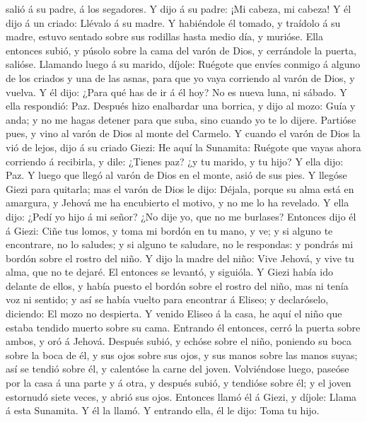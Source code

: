 salió á su padre, á los segadores.  Y dijo á su padre: ¡Mi
cabeza, mi cabeza! Y él dijo á un criado: Llévalo á su madre.
 Y habiéndole él tomado, y traídolo á su madre, estuvo
sentado sobre sus rodillas hasta medio día, y murióse. 
Ella entonces subió, y púsolo sobre la cama del varón de Dios, y
cerrándole la puerta, salióse.  Llamando luego á su marido,
díjole: Ruégote que envíes conmigo á alguno de los criados y una de las
asnas, para que yo vaya corriendo al varón de Dios, y vuelva.
 Y él dijo: ¿Para qué has de ir á él hoy? No es nueva luna,
ni sábado. Y ella respondió: Paz.  Después hizo enalbardar
una borrica, y dijo al mozo: Guía y anda; y no me hagas detener para que
suba, sino cuando yo te lo dijere.  Partióse pues, y vino
al varón de Dios al monte del Carmelo. Y cuando el varón de Dios la vió
de lejos, dijo á su criado Giezi: He aquí la Sunamita: 
Ruégote que vayas ahora corriendo á recibirla, y dile: ¿Tienes paz? ¿y
tu marido, y tu hijo? Y ella dijo: Paz.  Y luego que llegó
al varón de Dios en el monte, asió de sus pies. Y llegóse Giezi para
quitarla; mas el varón de Dios le dijo: Déjala, porque su alma está en
amargura, y Jehová me ha encubierto el motivo, y no me lo ha revelado.
 Y ella dijo: ¿Pedí yo hijo á mi señor? ¿No dije yo, que no
me burlases?  Entonces dijo él á Giezi: Ciñe tus lomos, y
toma mi bordón en tu mano, y ve; y si alguno te encontrare, no lo
saludes; y si alguno te saludare, no le respondas: y pondrás mi bordón
sobre el rostro del niño.  Y dijo la madre del niño: Vive
Jehová, y vive tu alma, que no te dejaré.  El entonces se
levantó, y siguióla. Y Giezi había ido delante de ellos, y había puesto
el bordón sobre el rostro del niño, mas ni tenía voz ni sentido; y así
se había vuelto para encontrar á Eliseo; y declaróselo, diciendo: El
mozo no despierta.  Y venido Eliseo á la casa, he aquí el
niño que estaba tendido muerto sobre su cama.  Entrando él
entonces, cerró la puerta sobre ambos, y oró á Jehová. 
Después subió, y echóse sobre el niño, poniendo su boca sobre la boca de
él, y sus ojos sobre sus ojos, y sus manos sobre las manos suyas; así se
tendió sobre él, y calentóse la carne del joven. 
Volviéndose luego, paseóse por la casa á una parte y á otra, y después
subió, y tendióse sobre él; y el joven estornudó siete veces, y abrió
sus ojos.  Entonces llamó él á Giezi, y díjole: Llama á
esta Sunamita. Y él la llamó. Y entrando ella, él le dijo: Toma tu hijo.
